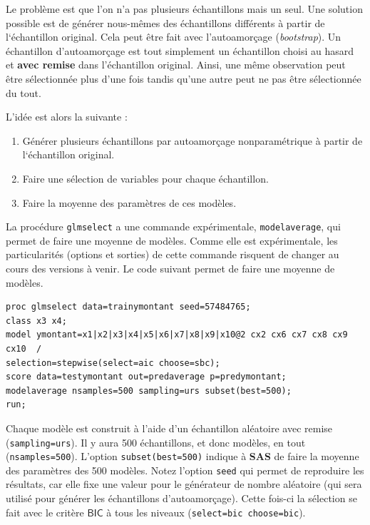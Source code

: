 \documentclass[
  11pt,
  letterpaper,
]{book}
\providecommand{\tightlist}{%
  \setlength{\itemsep}{0pt}\setlength{\parskip}{0pt}}
\theoremstyle{definition}
\theoremstyle{definition}
\theoremstyle{definition}
\theoremstyle{remark}
\begin{document}
Le problème est que l'on n'a pas plusieurs échantillons mais un seul. Une solution possible est de générer nous-mêmes des échantillons différents à partir de l`échantillon original. Cela peut être fait avec l'autoamorçage (\emph{bootstrap}). Un échantillon d'autoamorçage est tout simplement un échantillon choisi au hasard et \textbf{avec remise} dans l'échantillon original. Ainsi, une même observation peut être sélectionnée plus d'une fois tandis qu'une autre peut ne pas être sélectionnée du tout.

L'idée est alors la suivante :

\begin{enumerate}
\def\labelenumi{\arabic{enumi})}
\tightlist
\item
  Générer plusieurs échantillons par autoamorçage nonparamétrique à partir de l`échantillon original.
\item
  Faire une sélection de variables pour chaque échantillon.
\item
  Faire la moyenne des paramètres de ces modèles.
\end{enumerate}

La procédure \texttt{glmselect} a une commande expérimentale, \texttt{modelaverage}, qui permet de faire une moyenne de modèles. Comme elle est expérimentale, les particularités (options et sorties) de cette commande risquent de changer au cours des versions à venir. Le code suivant permet de faire une moyenne de modèles.

\begin{verbatim}
proc glmselect data=trainymontant seed=57484765;
class x3 x4;
model ymontant=x1|x2|x3|x4|x5|x6|x7|x8|x9|x10@2 cx2 cx6 cx7 cx8 cx9 cx10  /   
selection=stepwise(select=aic choose=sbc); 
score data=testymontant out=predaverage p=predymontant;
modelaverage nsamples=500 sampling=urs subset(best=500);
run;
\end{verbatim}

Chaque modèle est construit à l'aide d'un échantillon aléatoire avec remise (\texttt{sampling=urs}). Il y aura 500 échantillons, et donc modèles, en tout (\texttt{nsamples=500}). L'option \texttt{subset(best=500)} indique à \textbf{SAS} de faire la moyenne des paramètres des 500 modèles. Notez l'option \texttt{seed} qui permet de reproduire les résultats, car elle fixe une valeur pour le générateur de nombre aléatoire (qui sera utilisé pour générer les échantillons d'autoamorçage). Cette fois-ci la sélection se fait avec le critère \(\mathsf{BIC}\) à tous les niveaux (\texttt{select=bic\ choose=bic}).
\end{document}
